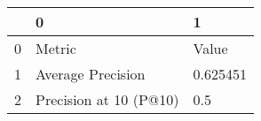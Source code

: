 \begin{tabular}{lll}
\toprule
{} &                       0 &         1 \\
\midrule
0 &                  Metric &     Value \\
1 &       Average Precision &  0.625451 \\
2 &  Precision at 10 (P@10) &       0.5 \\
\bottomrule
\end{tabular}
